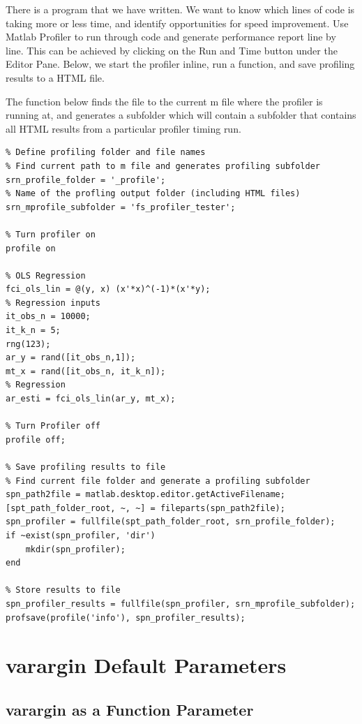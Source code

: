 \documentclass[
]{book}
\begin{document}
There is a program that we have written. We want to know which lines of
code is taking more or less time, and identify opportunities for speed
improvement. Use Matlab Profiler to run through code and generate
performance report line by line. This can be achieved by clicking on the
Run and Time button under the Editor Pane. Below, we start the profiler
inline, run a function, and save profiling results to a HTML file.

The function below finds the file to the current m file where the
profiler is running at, and generates a subfolder which will contain a
subfolder that contains all HTML results from a particular profiler
timing run.

\begin{verbatim}
% Define profiling folder and file names
% Find current path to m file and generates profiling subfolder
srn_profile_folder = '_profile';
% Name of the profling output folder (including HTML files)
srn_mprofile_subfolder = 'fs_profiler_tester';

% Turn profiler on
profile on

% OLS Regression
fci_ols_lin = @(y, x) (x'*x)^(-1)*(x'*y);
% Regression inputs
it_obs_n = 10000;
it_k_n = 5;
rng(123);
ar_y = rand([it_obs_n,1]);
mt_x = rand([it_obs_n, it_k_n]);
% Regression
ar_esti = fci_ols_lin(ar_y, mt_x);

% Turn Profiler off
profile off;

% Save profiling results to file
% Find current file folder and generate a profiling subfolder
spn_path2file = matlab.desktop.editor.getActiveFilename;
[spt_path_folder_root, ~, ~] = fileparts(spn_path2file);
spn_profiler = fullfile(spt_path_folder_root, srn_profile_folder);
if ~exist(spn_profiler, 'dir')
    mkdir(spn_profiler);
end

% Store results to file
spn_profiler_results = fullfile(spn_profiler, srn_mprofile_subfolder);
profsave(profile('info'), spn_profiler_results);
\end{verbatim}

\hypertarget{varargin-default-parameters}{%
\section{varargin Default Parameters}\label{varargin-default-parameters}}

\hypertarget{varargin-as-a-function-parameter}{%
\subsection{varargin as a Function Parameter}\label{varargin-as-a-function-parameter}}
\end{document}
